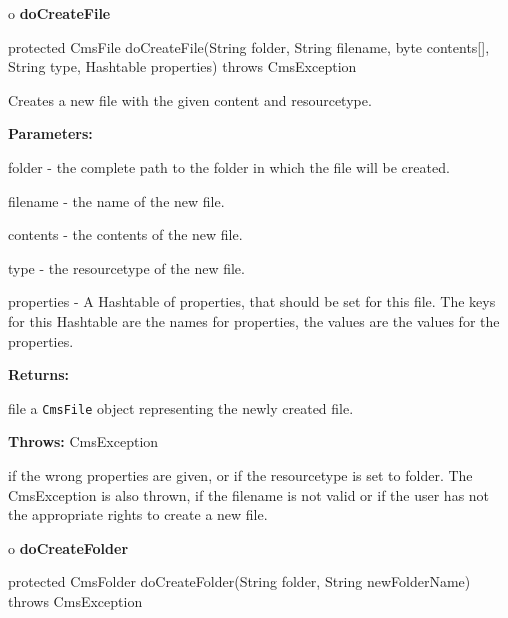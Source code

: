 o {\bf doCreateFile}

\begin{PRE}
 protected CmsFile doCreateFile(String folder,
                                String filename,
                                byte contents[],
                                String type,
                                Hashtable properties) throws CmsException
\end{PRE}

\begin{description}
\htmlDD Creates a new file with the given content and resourcetype.

\begin{description}
\item {\bf Parameters:}

folder - the complete path to the folder in which the file will be created.

filename - the name of the new file.

contents - the contents of the new file.

type - the resourcetype of the new file.

properties - A Hashtable of properties, that should be set for this file. The
keys for this Hashtable are the names for properties, the values are the
values for the properties.
\item {\bf Returns:}

file a {\tt CmsFile} object representing the newly created file.
\item {\bf Throws:} CmsException

if the wrong properties are given, or if the resourcetype is set to folder.
The CmsException is also thrown, if the filename is not valid or if the user
has not the appropriate rights to create a new file.
\end{description}

\end{description}

o {\bf doCreateFolder}

\begin{PRE}
 protected CmsFolder doCreateFolder(String folder,
                                    String newFolderName) throws CmsException
\end{PRE}

